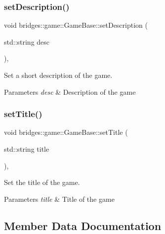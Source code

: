 \subsubsection{\texorpdfstring{setDescription()}{setDescription()}}
{\footnotesize\ttfamily void bridges\+::game\+::\+Game\+Base\+::set\+Description (\begin{DoxyParamCaption}\item[{std\+::string}]{desc }\end{DoxyParamCaption})\hspace{0.3cm}{\ttfamily [inline]}, {\ttfamily [protected]}}



Set a short description of the game. 


\begin{DoxyParams}{Parameters}
{\em desc} & Description of the game \\
\hline
\end{DoxyParams}
\mbox{\label{classbridges_1_1game_1_1_game_base_a108c2e3050a4d3f3af9950434e97102a}} 
\subsubsection{\texorpdfstring{setTitle()}{setTitle()}}
{\footnotesize\ttfamily void bridges\+::game\+::\+Game\+Base\+::set\+Title (\begin{DoxyParamCaption}\item[{std\+::string}]{title }\end{DoxyParamCaption})\hspace{0.3cm}{\ttfamily [inline]}, {\ttfamily [protected]}}



Set the title of the game. 


\begin{DoxyParams}{Parameters}
{\em title} & Title of the game \\
\hline
\end{DoxyParams}


\subsection{Member Data Documentation}
\mbox{\label{classbridges_1_1game_1_1_game_base_ad2af01edd927a31613d3b881286541bb}} 
